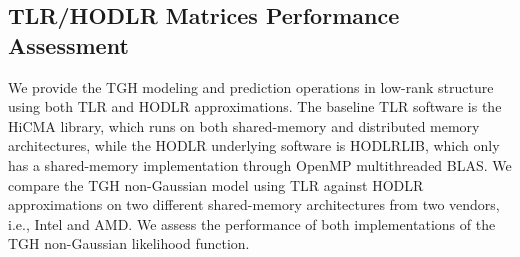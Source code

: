 \documentclass[conference]{IEEEtran}
\begin{document}
\subsection{TLR/HODLR Matrices Performance Assessment}
We provide the TGH modeling and prediction operations in
low-rank structure using both TLR and HODLR approximations.
The baseline TLR software is the HiCMA library, which runs on
both shared-memory and distributed memory architectures, while
the HODLR underlying software is HODLRLIB, which only has a shared-memory implementation through OpenMP
multithreaded BLAS. We compare the TGH non-Gaussian model using TLR
against HODLR approximations on two
different shared-memory architectures from two vendors, i.e., Intel
and AMD. We assess the performance of both
 implementations of the TGH non-Gaussian likelihood function.
\end{document}
